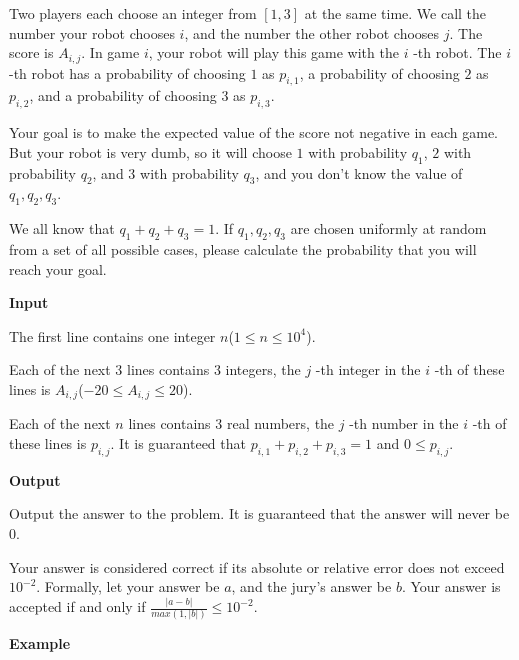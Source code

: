 \documentclass[a4paper]{article}
\begin{document}
Two players each choose an integer from $[1,3]$ at the same time. We call the number your robot chooses $i$, and the number the other robot chooses $j$.
The score is $A_{i,j}$.
In game $i$, your robot will play this game with the $i$ -th robot. The $i$ -th robot has a probability of choosing $1$ as $p_{i,1}$, a probability of choosing $2$ as $p_{i,2}$, and a probability of choosing $3$ as $p_{i,3}$.

Your goal is to make the expected value of the score not negative in each game. But your robot is very dumb, so it will choose $1$ with probability $q_1$, $2$ with probability $q_2$, and $3$ with probability $q_3$, and you don't know the value of $q_1,q_2,q_3$.

We all know that $q_1+q_2+q_3=1$. If $q_1,q_2,q_3$ are chosen uniformly at random from a set of all possible cases, please calculate the probability that you will reach your goal.

\vspace{0.01\textheight}
\textbf{\textsf{Input}}
\vspace{0.01\textheight}

The first line contains one integer $n$($1\le n\le10^4$).

Each of the next $3$ lines contains $3$ integers, the $j$ -th integer in the $i$ -th of these lines is $A_{i,j}$($-20\le A_{i,j}\le20$).

Each of the next $n$ lines contains $3$ real numbers, the $j$ -th number in the $i$ -th of these lines is $p_{i,j}$. It is guaranteed that $p_{i,1}+p_{i,2}+p_{i,3}=1$ and $0\le p_{i,j}$.

\vspace{0.01\textheight}
\textbf{\textsf{Output}}
\vspace{0.01\textheight}

Output the answer to the problem. It is guaranteed that the answer will never be $0$.

Your answer is considered correct if its absolute or relative error does not exceed $10^{-2}$. Formally, let your answer be $a$, and the jury's answer be $b$. Your answer is accepted if and only if $\frac{|a-b|}{max(1,|b|)} \leq 10^{-2}$.

\vspace{0.01\textheight}
\textbf{\textsf{Example}}
\vspace{0.01\textheight}
\end{document}
